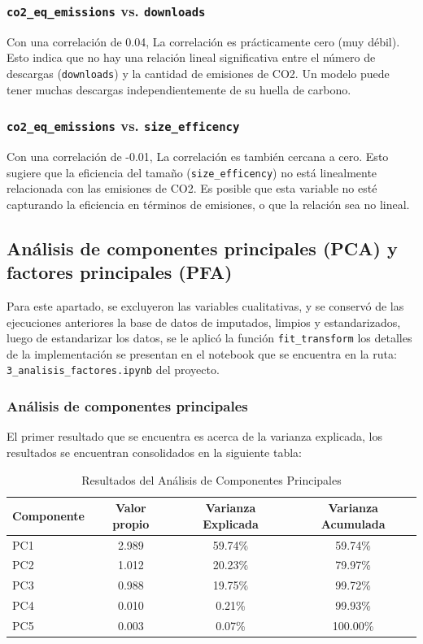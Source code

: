 \documentclass[journal]{IEEEtran}
\begin{document}
	\subsubsection{\texttt{co2\_eq\_emissions} vs. \texttt{downloads}}
	Con una correlación de 0.04, La correlación es prácticamente cero (muy débil). Esto indica que no hay una relación lineal significativa entre el número de descargas (\texttt{downloads}) y la cantidad de emisiones de CO2. Un modelo puede tener muchas descargas independientemente de su huella de carbono.
	
	\subsubsection{\texttt{co2\_eq\_emissions} vs. \texttt{size\_efficency}}
	Con una correlación de -0.01, La correlación es también cercana a cero. Esto sugiere que la eficiencia del tamaño (\texttt{size\_efficency}) no está linealmente relacionada con las emisiones de CO2. Es posible que esta variable no esté capturando la eficiencia en términos de emisiones, o que la relación sea no lineal.
	
	\subsection{Análisis de componentes principales (PCA) y factores principales (PFA)}
	Para este apartado, se excluyeron las variables cualitativas, y se conservó de las ejecuciones anteriores la base de datos de imputados, limpios y estandarizados, luego de estandarizar los datos, se le aplicó la función \texttt{fit\_transform} los detalles de la implementación se presentan en el notebook que se encuentra en la ruta: \texttt{3\_analisis\_factores.ipynb} del proyecto.
	\subsubsection{Análisis de componentes principales}
	El primer resultado que se encuentra es acerca de la varianza explicada, los resultados se encuentran consolidados en la siguiente tabla:
	
	\begin{table}[H]
		\centering
		\caption{Resultados del Análisis de Componentes Principales}
		\begin{tabular}{l c c c}
			\toprule
			Componente & Valor propio & Varianza Explicada & Varianza Acumulada \\
			\midrule
			PC1 & 2.989 & 59.74\% & 59.74\% \\
			PC2 & 1.012 & 20.23\% & 79.97\% \\
			PC3 & 0.988 & 19.75\% & 99.72\% \\
			PC4 & 0.010 & 0.21\%  & 99.93\% \\
			PC5 & 0.003 & 0.07\% & 100.00\% \\
			\bottomrule
		\end{tabular}
		\label{tab:pca_results}
	\end{table}
\end{document}
